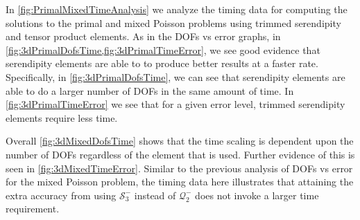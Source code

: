 \documentclass[format=acmsmall,screen,timestamp=false,a4paper]{acmart}
\begin{document}
In \cref{fig:PrimalMixedTimeAnalysis} we analyze the timing data for computing the solutions to the primal and mixed Poisson problems using trimmed serendipity and tensor product elements.  As in the DOFs vs error graphs, in \cref{fig:3dPrimalDofsTime,fig:3dPrimalTimeError}, we see good evidence that serendipity elements are able to to produce better results at a faster rate.  Specifically, in \cref{fig:3dPrimalDofsTime}, we can see that serendipity elements are able to do a larger number of DOFs in the same amount of time.  In \cref{fig:3dPrimalTimeError} we see that for a given error level, trimmed serendipity elements require less time. 

Overall \cref{fig:3dMixedDofsTime} shows that the time scaling is dependent upon the number of DOFs regardless of the element that is used.  Further evidence of this is seen in \cref{fig:3dMixedTimeError}.  Similar to the previous analysis of DOFs vs error for the mixed Poisson problem, the timing data here illustrates that attaining the extra accuracy from using $\mathcal{S}^-_3$ instead of $\mathcal{Q}^-_2$ does not invoke a larger time requirement.  



\end{document}
